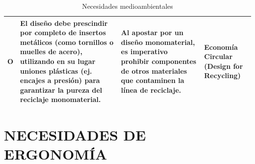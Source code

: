 \documentclass[11pt,a4paper]{article}
\begin{document}
\begin{table}[H]
\begin{tabular}{|p{2.8cm}|p{5.5cm}|p{2.5cm}|p{3.0cm}|}
\hline
O & El diseño debe prescindir por completo de insertos metálicos (como tornillos o muelles de acero), utilizando en su lugar uniones plásticas (ej. encajes a presión) para garantizar la pureza del reciclaje monomaterial.& Al apostar por un diseño monomaterial, es imperativo prohibir componentes de otros materiales que contaminen la línea de reciclaje. & Economía Circular (Design for Recycling) \\
\hline
\end{tabular}
\caption{Necesidades medioambientales}
\end{table}

\newpage
\section{NECESIDADES DE ERGONOMÍA}

\vspace{0.5cm}
\end{document}
